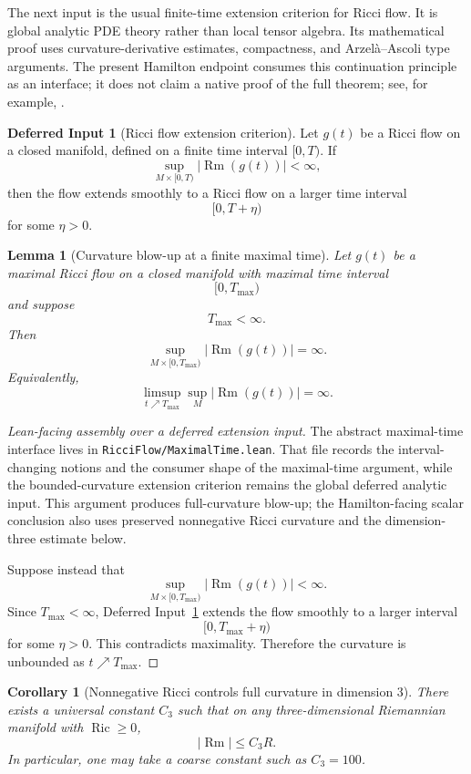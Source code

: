 \documentclass[11pt]{article}
\theoremstyle{plain}
\newtheorem{lemma}[theorem]{Lemma}
\newtheorem{corollary}[theorem]{Corollary}
\theoremstyle{definition}
\newtheorem{deferred}[theorem]{Deferred Input}
\theoremstyle{remark}
\newcommand{\Ric}{\operatorname{Ric}}
\newcommand{\Rm}{\operatorname{Rm}}
\newcommand{\norm}[1]{\left|#1\right|}
\newcommand{\leanfile}[1]{\nolinkurl{#1}}
\newcommand{\rffile}[1]{\leanfile{#1}}
\begin{document}
The next input is the usual finite-time extension criterion for Ricci flow.
It is global analytic PDE theory rather than local tensor algebra.  Its
mathematical proof uses curvature-derivative estimates, compactness, and
Arzel\`a--Ascoli type arguments.  The present Hamilton endpoint consumes this
continuation principle as an interface; it does not claim a native proof of the
full theorem; see, for example, \cite{MR2274812,MR2061425}.


\begin{deferred}[Ricci flow extension criterion]
\label{bb:rf-extension-criterion}
Let $g(t)$ be a Ricci flow on a closed manifold, defined on a finite time
interval $[0,T)$. If
\[
\sup_{M\times[0,T)} \norm{\Rm(g(t))}<\infty,
\]
then the flow extends smoothly to a Ricci flow on a larger time interval
\[
[0,T+\eta)
\]
for some $\eta>0$.
\end{deferred}

\begin{lemma}[Curvature blow-up at a finite maximal time]
\label{lem:finite-time-curvature-blow-up}
Let $g(t)$ be a maximal Ricci flow on a closed manifold with maximal time
interval
\[
[0,T_{\max})
\]
and suppose
\[
T_{\max}<\infty.
\]
Then
\[
\sup_{M\times[0,T_{\max})}\norm{\Rm(g(t))}=\infty.
\]
Equivalently,
\[
\limsup_{t\nearrow T_{\max}}\sup_M\norm{\Rm(g(t))}=\infty.
\]
\end{lemma}

\begin{proof}[Lean-facing assembly over a deferred extension input]
The abstract maximal-time interface lives in
\rffile{RicciFlow/MaximalTime.lean}.  That file records the interval-changing
notions and the consumer shape of the maximal-time argument, while the
bounded-curvature extension criterion remains the global deferred analytic
input.  This argument produces full-curvature blow-up; the Hamilton-facing
scalar conclusion also uses preserved nonnegative Ricci curvature and the
dimension-three estimate below.

Suppose instead that
\[
\sup_{M\times[0,T_{\max})}\norm{\Rm(g(t))}<\infty.
\]
Since $T_{\max}<\infty$, Deferred Input~\ref{bb:rf-extension-criterion} extends the
flow smoothly to a larger interval
\[
[0,T_{\max}+\eta)
\]
for some $\eta>0$.  This contradicts maximality.  Therefore the curvature is
unbounded as \(t\nearrow T_{\max}\).
\end{proof}

\begin{corollary}[Nonnegative Ricci controls full curvature in dimension $3$]
\label{cor:ricci-controls-rm}
There exists a universal constant $C_3$ such that on any three-dimensional
Riemannian manifold with $\Ric\ge0$,
\[
\norm{\Rm}\le C_3R.
\]
In particular, one may take a coarse constant such as $C_3=100$.
\end{corollary}
\end{document}
